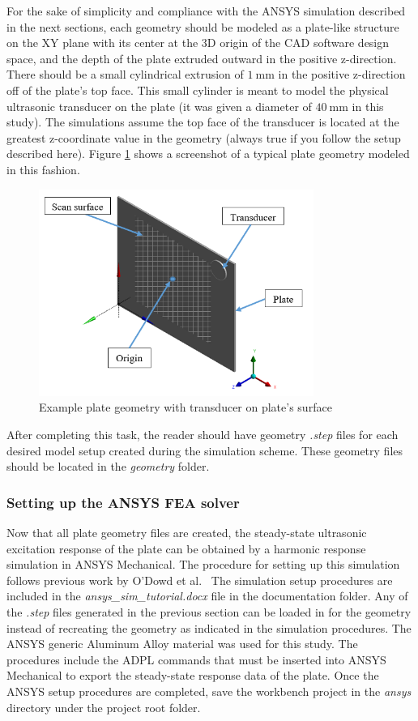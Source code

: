 \documentclass[11pt,letterpaper]{article}
\begin{document}
			For the sake of simplicity and compliance with the ANSYS simulation described in the next sections, each geometry should be modeled as a plate-like structure on the XY plane with its center at the 3D origin of the CAD software design space, and the depth of the plate extruded outward in the positive z-direction. There should be a small cylindrical extrusion of $1\ \si{\milli\metre}$ in the positive z-direction off of the plate's top face. This small cylinder is meant to model the physical ultrasonic transducer on the plate (it was given a diameter of $40\ \si{\milli\metre}$ in this study). The simulations assume the top face of the transducer is located at the greatest z-coordinate value in the geometry (always true if you follow the setup described here). Figure \ref{fig:geometry} shows a screenshot of a typical plate geometry modeled in this fashion.
			\begin{figure}[H]
			\centering
			\includegraphics[width=0.8\textwidth]{plate_geometry.png}
			\caption{Example plate geometry with transducer on plate's surface}
			\label{fig:geometry}
			\end{figure}
			After completing this task, the reader should have geometry \textit{.step} files for each desired model setup created during the simulation scheme. These geometry files should be located in the \textit{geometry} folder.
			\subsubsection{Setting up the ANSYS FEA solver}
			Now that all plate geometry files are created, the steady-state ultrasonic excitation response of the plate can be obtained by a harmonic response simulation in ANSYS Mechanical. The procedure for setting up this simulation follows previous work by O'Dowd et al.\ \cite{o2016exploring} The simulation setup procedures are included in the \textit{ansys\_sim\_tutorial.docx} file in the documentation folder. Any of the \textit{.step} files generated in the previous section can be loaded in for the geometry instead of recreating the geometry as indicated in the simulation procedures. The ANSYS generic Aluminum Alloy material was used for this study. The procedures include the ADPL commands that must be inserted into ANSYS Mechanical to export the steady-state response data of the plate. Once the ANSYS setup procedures are completed, save the workbench project in the \textit{ansys} directory under the project root folder.
\end{document}
